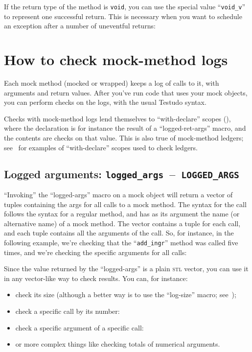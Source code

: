 \documentclass[twoside, a4paper, article]{memoir}
\newcommand*\testudocolor{\color{red!80!blue}}
\newcommand*\testudo[1]{\texttt{\testudocolor{}#1}}
\newcommand*\testudopair[2]{\testudo{#1}~--~\testudo{#2}}
\newcommand\subsectiontestudopair[3]{%
  \subsection[#1]{#1: \testudopair{#2}{#3}}}
\newcommand\typesetexample[1]{%
  \typesetexamplesource{#1}
}
\providecommand\typesetexamplesource[1]{%
}
\begin{document}
If the return type of the method is \texttt{void}, you can use the special
value ``\texttt{void\_v}'' to represent one successful return.  This is
necessary when you want to schedule an exception after a number of uneventful
returns:

\typesetexample{mock-class-mock-method-schedule-exception-after-void}

\section{How to check mock-method logs}
\label{sec:check-mock-method-logs}

Each mock method (mocked or wrapped) keeps a log of calls to it, with arguments
and return values.  After you've run code that uses your mock objects, you can
perform checks on the logs, with the usual Testudo syntax.

Checks with mock-method logs lend themselves to ``with-declare'' scopes
(), where the declaration is for instance the
result of a ``logged-ret-args'' macro, and the contents are checks on that
value.  This is also true of mock-method ledgers; see~
for examples of ``with-declare'' scopes used to check ledgers.

\subsectiontestudopair{Logged arguments}{logged\_args}{LOGGED\_ARGS}

``Invoking'' the ``logged-args'' macro on a mock object will return a vector of
tuples containing the args for all calls to a mock method.  The syntax for the
call follows the syntax for a regular method, and has as its argument the name
(or alternative name) of a mock method.  The vector contains a tuple for each
call, and each tuple contains all the arguments of the call.  So, for instance,
in the following example, we're checking that the ``\texttt{add\_ingr}'' method
was called five times, and we're checking the specific arguments for all calls:

\typesetexample{check-mock-method-logs}

Since the value returned by the ``logged-args'' is a plain \textsc{stl} vector,
you can use it in any vector-like way to check results.  You can, for instance:
\begin{itemize}
\item check its size (although a better way is to use the ``log-size'' macro;
  see~);
\item check a specific call by its number:

  \typesetexample{check-mock-method-logs-specific-call}

\item check a specific argument of a specific call:

  \typesetexample{check-mock-method-logs-specific-call-specific-argument}

\item or more complex things like checking totals of numerical arguments.
\end{itemize}
\end{document}
